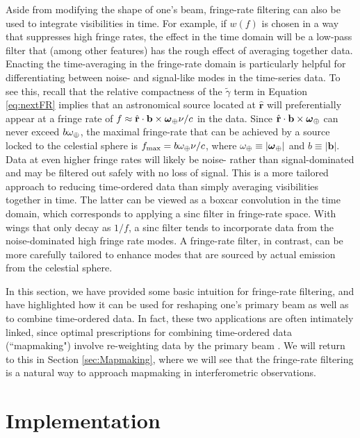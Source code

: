 \documentclass[twocolumn,apj,numberedappendix]{emulateapj}
\newcommand{\rhat}{\hat{\mathbf{r}}}
\begin{document}
Aside from modifying the shape of one's beam, fringe-rate filtering can also be used to integrate visibilities in time. For example, if $w(f)$ is chosen in a way that suppresses high fringe rates, the effect in the time domain will be a low-pass filter that (among other features) has the rough effect of averaging together data. Enacting the time-averaging in the fringe-rate domain is particularly helpful for differentiating between noise- and signal-like modes in the time-series data. To see this, recall that the relative compactness of the $\tilde{\gamma}$ term in Equation \eqref{eq:nextFR} implies that an astronomical source located at $\rhat$ will preferentially appear at a fringe rate of $f \approx \rhat \cdot \mathbf{b} \times \boldsymbol \omega_\Earth \nu / c $ in the data. Since $\rhat \cdot \mathbf{b} \times \boldsymbol \omega_\Earth$ can never exceed $b \omega_\oplus $, the maximal fringe-rate that can be achieved by a source locked to the celestial sphere is $f_\textrm{max} = b \omega_\oplus  \nu / c$, where $\omega_\oplus \equiv | \boldsymbol \omega_\oplus|$ and $b \equiv | \mathbf{b}|$. Data at even higher fringe rates will likely be noise- rather than signal-dominated and may be filtered out safely with no loss of signal. This is a more tailored approach to reducing time-ordered data than simply averaging visibilities together in time. The latter can be viewed as a boxcar convolution in the time domain, which corresponds to applying a sinc filter in fringe-rate space. With wings that only decay as $1/f$, a sinc filter tends to incorporate data from the noise-dominated high fringe rate modes. A fringe-rate filter, in contrast, can be more carefully tailored to enhance modes that are sourced by actual emission from the celestial sphere.

In this section, we have provided some basic intuition for fringe-rate filtering, and have highlighted how it can be used for reshaping one's primary beam as well as to combine time-ordered data. In fact, these two applications are often intimately linked, since optimal prescriptions for combining time-ordered data (``mapmaking") involve re-weighting data by the primary beam \citep{T97mapmaking,Morales2009,dillon_et_al2015}. We will return to this in Section \ref{sec:Mapmaking}, where we will see that the fringe-rate filtering is a natural way to approach mapmaking in interferometric observations.




\section{Implementation}
\label{sec:Implementation}
\end{document}
